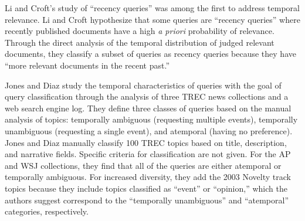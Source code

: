 \documentclass{asist}
\begin{document}
\begin{table}
\small
{}
\caption{TREC topics and Collections Used in Prior Temporal Retrieval Studies.}
\label{table.topics}
\end{table}

Li and Croft's study of ``recency queries''  \cite{Li2003} was among the first to address temporal relevance. Li and Croft hypothesize that some queries are ``recency queries'' where recently published documents have a high \textit{a priori} probability of relevance.  Through the direct analysis of the temporal distribution of judged relevant documents, they classify a subset of queries as recency queries because they have ``more relevant documents in the recent past.''

Jones and Diaz \cite{Jones2007} study the temporal characteristics of queries with the goal of query classification through the analysis of three TREC news collections and a web search engine log. They define three classes of queries based on the manual analysis of topics: temporally ambiguous (requesting multiple events),  temporally unambiguous (requesting a single event), and atemporal (having no preference). Jones and Diaz manually classify 100 TREC topics based on title, description, and narrative fields. Specific criteria for classification are not given. For the AP and WSJ collections, they find that all of the queries are either atemporal or temporally ambiguous. For increased diversity, they add the 2003 Novelty track topics because they include topics classified as ``event'' or ``opinion,'' which the authors suggest correspond to the ``temporally unambiguous'' and ``atemporal'' categories, respectively.
\end{document}

